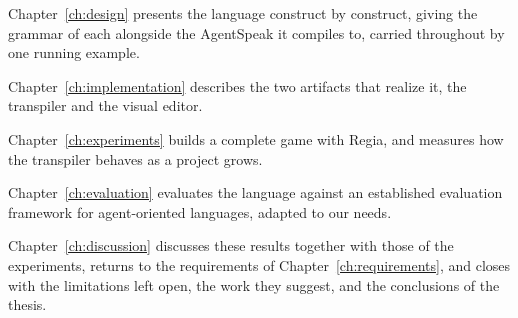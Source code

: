 Chapter~\ref{ch:design} presents the language construct by construct, giving the grammar of each alongside the AgentSpeak it compiles to, carried throughout by one running example.

Chapter~\ref{ch:implementation} describes the two artifacts that realize it, the transpiler and the visual editor.

Chapter~\ref{ch:experiments} builds a complete game with Regia, and measures how the transpiler behaves as a project grows.

Chapter~\ref{ch:evaluation} evaluates the language against an established evaluation framework for agent-oriented languages, adapted to our needs.
 
Chapter~\ref{ch:discussion} discusses these results together with those of the experiments, returns to the requirements of Chapter~\ref{ch:requirements}, and closes with the limitations left open, the work they suggest, and the conclusions of the thesis.

